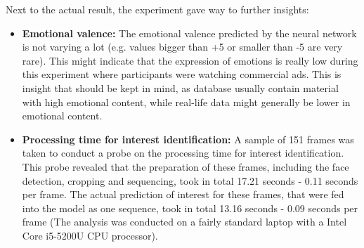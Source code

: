 \newline\newline
Next to the actual result, the experiment gave way to further insights:\newline
\begin{itemize}
    \item \textbf{Emotional valence:} The emotional valence predicted by the neural network is not varying a lot (e.g. values bigger than +5 or smaller than -5 are very rare). This might indicate that the expression of emotions is really low during this experiment where participants were watching commercial ads. This is insight that should be kept in mind, as database usually contain material with high emotional content, while real-life data might generally be lower in emotional content.
    \item \textbf{Processing time for interest identification:} A sample of 151 frames was taken to conduct a probe on the processing time for interest identification. This probe revealed that the preparation of these frames, including the face detection, cropping and sequencing, took in total 17.21 seconds - 0.11 seconds per frame. The actual prediction of interest for these frames, that were fed into the model as one sequence, took in total 13.16 seconds - 0.09 seconds per frame (The analysis was conducted on a fairly standard laptop with a Intel Core i5-5200U CPU processor).
\end{itemize}




